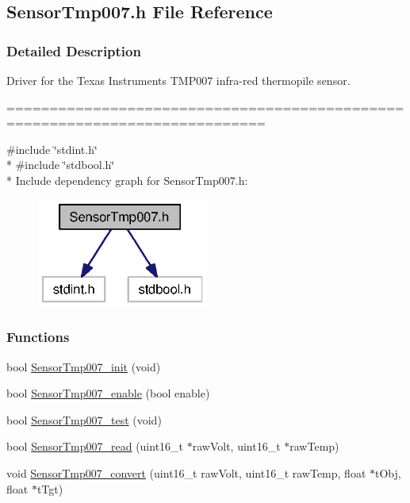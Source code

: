 \subsection{Sensor\+Tmp007.\+h File Reference}
\label{_sensor_tmp007_8h}


\subsubsection{Detailed Description}
Driver for the Texas Instruments T\+M\+P007 infra-\/red thermopile sensor. 

============================================================================



{\ttfamily \#include \char`\"{}stdint.\+h\char`\"{}}\\*
{\ttfamily \#include \char`\"{}stdbool.\+h\char`\"{}}\\*
Include dependency graph for Sensor\+Tmp007.\+h\+:
\nopagebreak
\begin{figure}[H]
\begin{center}
\leavevmode
\includegraphics[width=159pt]{_sensor_tmp007_8h__incl}
\end{center}
\end{figure}
\subsubsection*{Functions}
\begin{DoxyCompactItemize}
\item 
bool \hyperlink{_sensor_tmp007_8h_a8f9c955c533d3b9e3abf7848d6669cf8}{Sensor\+Tmp007\+\_\+init} (void)
\item 
bool \hyperlink{_sensor_tmp007_8h_aa200c26bb3b24ad1c8d496f270c83581}{Sensor\+Tmp007\+\_\+enable} (bool enable)
\item 
bool \hyperlink{_sensor_tmp007_8h_a4fd07cef509ed6e176878f9bab4b5c8b}{Sensor\+Tmp007\+\_\+test} (void)
\item 
bool \hyperlink{_sensor_tmp007_8h_a144a9e0070dfcf6aab83940b10aa5056}{Sensor\+Tmp007\+\_\+read} (uint16\+\_\+t $\ast$raw\+Volt, uint16\+\_\+t $\ast$raw\+Temp)
\item 
void \hyperlink{_sensor_tmp007_8h_a01dedf941b1ec6a94887d60f189af8af}{Sensor\+Tmp007\+\_\+convert} (uint16\+\_\+t raw\+Volt, uint16\+\_\+t raw\+Temp, float $\ast$t\+Obj, float $\ast$t\+Tgt)
\end{DoxyCompactItemize}



